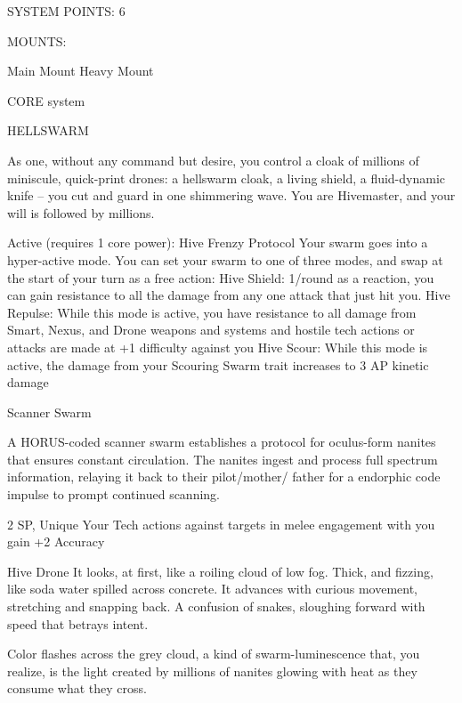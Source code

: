                                             SYSTEM POINTS: 6 

                                                 MOUNTS: 

 Main Mount                                          Heavy Mount 

                                               CORE system 

                                                                                                          


                                                    HELLSWARM 

 As one, without any command but desire, you control a cloak of millions of miniscule, quick-print 
 drones: a hellswarm cloak, a living shield, a fluid-dynamic knife -- you cut and guard in one shimmering 
 wave. You are Hivemaster, and your will is followed by millions. 

 Active (requires 1 core power): Hive Frenzy 
 Protocol 
 Your swarm goes into a hyper-active mode. You can set your swarm to one of three modes, and swap 
 at the start of your turn as a free action: 
 Hive Shield: 1/round as a reaction, you can gain resistance to all the damage from any one attack that 
 just hit you. 
 Hive Repulse: While this mode is active, you have resistance to all damage from Smart, Nexus, and 
  Drone weapons and systems and hostile tech actions or attacks are made at +1 difficulty against you 
 Hive Scour: While this mode is active, the damage from your Scouring Swarm trait increases to 3 AP 
  kinetic damage 

Scanner Swarm  

A HORUS-coded scanner swarm establishes a protocol for oculus-form nanites that ensures constant  
circulation. The nanites ingest and process full spectrum information, relaying it back to their pilot/mother/ 
father for a endorphic code impulse to prompt continued scanning.   

2 SP, Unique  
Your Tech actions against targets in melee engagement with you gain +2 Accuracy
 

Hive Drone  
It looks, at first, like a roiling cloud of low fog. Thick, and fizzing, like soda water spilled across concrete. It  
advances with curious movement, stretching and snapping back. A confusion of snakes, sloughing forward  
with speed that betrays intent.  

Color flashes across the grey cloud, a kind of swarm-luminescence that, you realize, is the light created by  
millions of nanites glowing with heat as they consume what they cross.   

